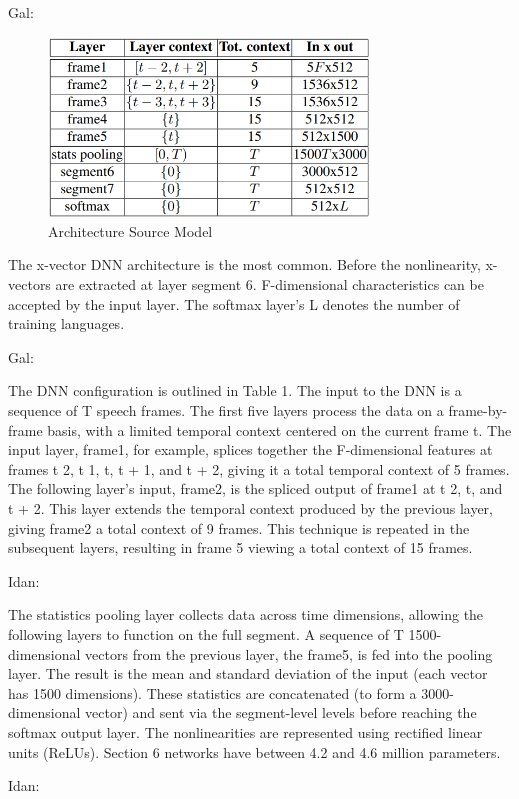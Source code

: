 \documentclass[a4paper]{article}
\begin{document}
Gal:

\begin{figure}[htp]
    \centering
    \includegraphics[width=8.5cm]{table.png}
    \caption{Architecture Source Model}
\end{figure}

The x-vector DNN architecture is the most common. Before the nonlinearity, x-vectors are extracted at layer segment 6. F-dimensional characteristics can be accepted by the input layer.
The softmax layer's L denotes the number of training languages.

Gal:

The DNN configuration is outlined in Table 1. The
input to the DNN is a sequence of T speech frames.
The first five layers process the data on a frame-by-frame basis, with a limited temporal context centered on the current frame t.
The input layer, frame1, for example, splices together the F-dimensional features at frames t 2, t 1, t, t + 1, and t + 2, giving it a total temporal context of 5 frames. The following layer's input, frame2, is the spliced output of frame1 at t 2, t, and t + 2. This layer extends the temporal context produced by the previous layer, giving frame2 a total context of 9 frames. This technique is repeated in the subsequent layers, resulting in frame 5 viewing a total context of 15 frames.

Idan:

The statistics pooling layer collects data across time dimensions, allowing the following layers to function on the full segment. A sequence of T 1500-dimensional vectors from the previous layer, the frame5, is fed into the pooling layer. The result is the mean and standard deviation of the input (each vector has 1500 dimensions). These statistics are concatenated (to form a 3000-dimensional vector) and sent via the segment-level levels before reaching the softmax output layer.
The nonlinearities are represented using rectified linear units (ReLUs). Section 6 networks have between 4.2 and 4.6 million parameters.

Idan:
\end{document}
